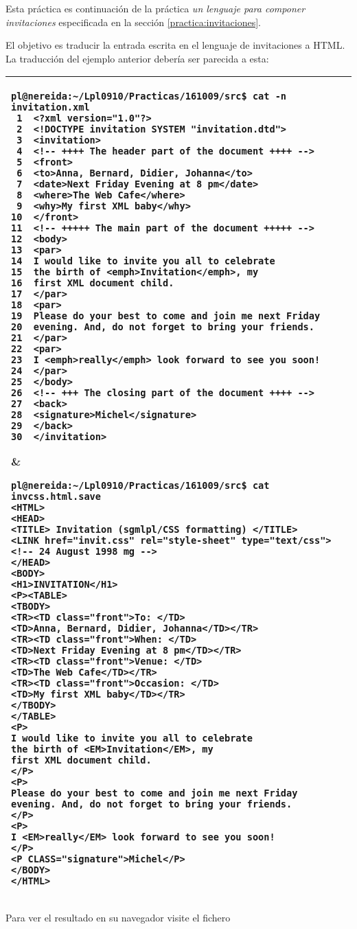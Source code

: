 
Esta práctica es continuación
de la práctica {\it un lenguaje para componer invitaciones}
especificada en la sección
\ref{practica:invitaciones}.

El objetivo es traducir la entrada escrita en el lenguaje de invitaciones
a HTML. La traducción del ejemplo anterior debería ser parecida a esta:
\begin{tabular}{|p{12cm}|p{12cm}|}
\hline
\begin{verbatim}
pl@nereida:~/Lpl0910/Practicas/161009/src$ cat -n invitation.xml
 1  <?xml version="1.0"?>
 2  <!DOCTYPE invitation SYSTEM "invitation.dtd">
 3  <invitation>
 4  <!-- ++++ The header part of the document ++++ -->
 5  <front>
 6  <to>Anna, Bernard, Didier, Johanna</to>
 7  <date>Next Friday Evening at 8 pm</date>
 8  <where>The Web Cafe</where>
 9  <why>My first XML baby</why>
10  </front>
11  <!-- +++++ The main part of the document +++++ -->
12  <body>
13  <par>
14  I would like to invite you all to celebrate
15  the birth of <emph>Invitation</emph>, my
16  first XML document child.
17  </par>
18  <par>
19  Please do your best to come and join me next Friday
20  evening. And, do not forget to bring your friends.
21  </par>
22  <par>
23  I <emph>really</emph> look forward to see you soon!
24  </par>
25  </body>
26  <!-- +++ The closing part of the document ++++ -->
27  <back>
28  <signature>Michel</signature>
29  </back>
30  </invitation>
\end{verbatim}
&
\begin{verbatim}
pl@nereida:~/Lpl0910/Practicas/161009/src$ cat invcss.html.save
<HTML>
<HEAD>
<TITLE> Invitation (sgmlpl/CSS formatting) </TITLE>
<LINK href="invit.css" rel="style-sheet" type="text/css">
<!-- 24 August 1998 mg -->
</HEAD>
<BODY>
<H1>INVITATION</H1>
<P><TABLE>
<TBODY>
<TR><TD class="front">To: </TD>
<TD>Anna, Bernard, Didier, Johanna</TD></TR>
<TR><TD class="front">When: </TD>
<TD>Next Friday Evening at 8 pm</TD></TR>
<TR><TD class="front">Venue: </TD>
<TD>The Web Cafe</TD></TR>
<TR><TD class="front">Occasion: </TD>
<TD>My first XML baby</TD></TR>
</TBODY>
</TABLE>
<P>
I would like to invite you all to celebrate
the birth of <EM>Invitation</EM>, my
first XML document child.
</P>
<P>
Please do your best to come and join me next Friday
evening. And, do not forget to bring your friends.
</P>
<P>
I <EM>really</EM> look forward to see you soon!
</P>
<P CLASS="signature">Michel</P>
</BODY>
</HTML>
\end{verbatim}\\
\hline
\end{tabular}
Para ver el resultado en su navegador visite el fichero

